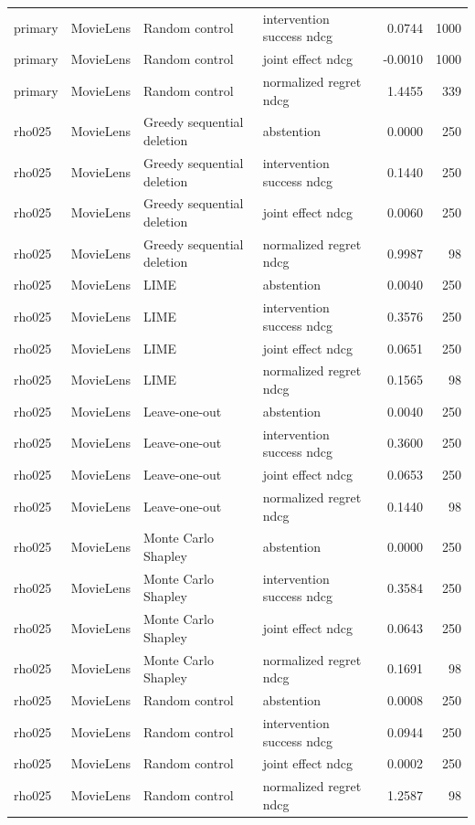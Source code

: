 \begin{longtable}{@{}p{.16\linewidth}p{.11\linewidth}p{.15\linewidth}p{.22\linewidth}rr@{}}
primary & MovieLens & Random control & intervention success ndcg & 0.0744 & 1000 \\
primary & MovieLens & Random control & joint effect ndcg & -0.0010 & 1000 \\
primary & MovieLens & Random control & normalized regret ndcg & 1.4455 & 339 \\
rho025 & MovieLens & Greedy sequential deletion & abstention & 0.0000 & 250 \\
rho025 & MovieLens & Greedy sequential deletion & intervention success ndcg & 0.1440 & 250 \\
rho025 & MovieLens & Greedy sequential deletion & joint effect ndcg & 0.0060 & 250 \\
rho025 & MovieLens & Greedy sequential deletion & normalized regret ndcg & 0.9987 & 98 \\
rho025 & MovieLens & LIME & abstention & 0.0040 & 250 \\
rho025 & MovieLens & LIME & intervention success ndcg & 0.3576 & 250 \\
rho025 & MovieLens & LIME & joint effect ndcg & 0.0651 & 250 \\
rho025 & MovieLens & LIME & normalized regret ndcg & 0.1565 & 98 \\
rho025 & MovieLens & Leave-one-out & abstention & 0.0040 & 250 \\
rho025 & MovieLens & Leave-one-out & intervention success ndcg & 0.3600 & 250 \\
rho025 & MovieLens & Leave-one-out & joint effect ndcg & 0.0653 & 250 \\
rho025 & MovieLens & Leave-one-out & normalized regret ndcg & 0.1440 & 98 \\
rho025 & MovieLens & Monte Carlo Shapley & abstention & 0.0000 & 250 \\
rho025 & MovieLens & Monte Carlo Shapley & intervention success ndcg & 0.3584 & 250 \\
rho025 & MovieLens & Monte Carlo Shapley & joint effect ndcg & 0.0643 & 250 \\
rho025 & MovieLens & Monte Carlo Shapley & normalized regret ndcg & 0.1691 & 98 \\
rho025 & MovieLens & Random control & abstention & 0.0008 & 250 \\
rho025 & MovieLens & Random control & intervention success ndcg & 0.0944 & 250 \\
rho025 & MovieLens & Random control & joint effect ndcg & 0.0002 & 250 \\
rho025 & MovieLens & Random control & normalized regret ndcg & 1.2587 & 98 \\
\end{longtable}
